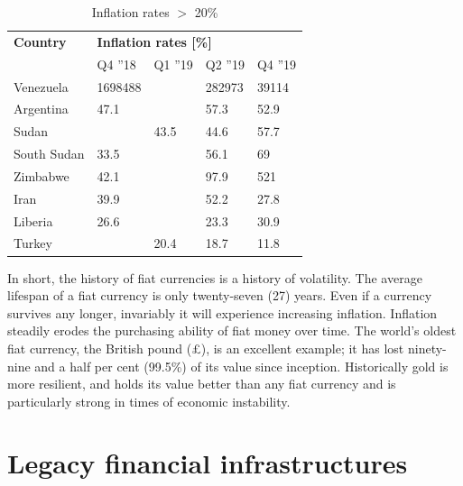 \begin{table}
\centering
\caption{Inflation rates $>$ 20\%}
\begin{tabular}{@{}lllll@{}}
\toprule
\textbf{Country} & \multicolumn{3}{l}{\textbf{Inflation rates {[}\%{]}}} \\ 
\textbf{}        & Q4 ''18          & Q1 ''19          & Q2 ''19    & Q4 ''19     \\ \midrule
Venezuela        & 1698488          &                  & 282973     & 39114    \\
Argentina        & 47.1             &                  & 57.3       & 52.9    \\
Sudan            &                  & 43.5             & 44.6       & 57.7    \\
South Sudan      & 33.5             &                  & 56.1       & 69    \\
Zimbabwe         & 42.1             &                  & 97.9       & 521   \\
Iran             & 39.9             &                  & 52.2       & 27.8     \\
Liberia          & 26.6             &                  & 23.3       & 30.9     \\
Turkey           &                  & 20.4             & 18.7       & 11.8           \\ \bottomrule
\end{tabular}
\label{tab:inflationratescountries}
\end{table}


\noindent In short, the history of fiat currencies is a history of volatility. The average lifespan of a fiat currency is only twenty-seven (27) years. Even if a currency survives any longer, invariably it will experience increasing inflation. Inflation steadily erodes the purchasing ability of fiat money over time. The world's oldest fiat currency, the British pound (\pounds), is an excellent example; it has lost ninety-nine and a half per cent (99.5\%) of its value since inception. Historically gold is more resilient, and holds its value better than any fiat currency and is particularly strong in times of economic instability.

\section{Legacy financial infrastructures}

